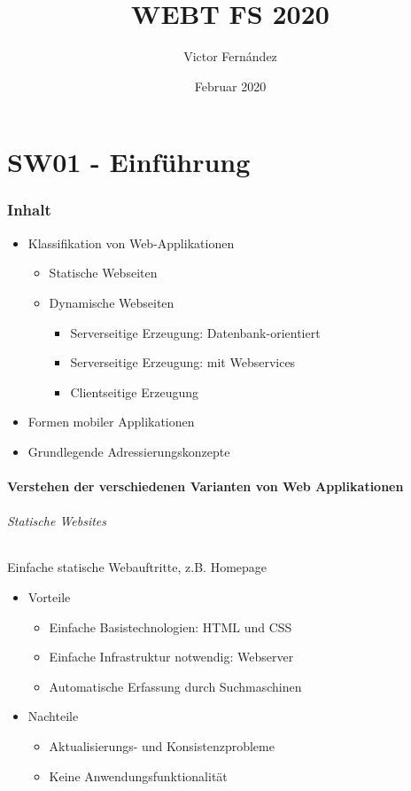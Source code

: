 \documentclass[10pt,a4paper]{article}
\title{WEBT FS 2020}
\author{Victor Fernández}
\date{Februar 2020}
\begin{document}
\maketitle
\tableofcontents
\thispagestyle{empty}
\pagebreak

\part{SW01 - Einführung}
\section{Inhalt}
\begin{itemize}[noitemsep,topsep=0pt,leftmargin=*]
    \item Klassifikation von Web-Applikationen
    \begin{itemize}[noitemsep,topsep=0pt,leftmargin=*]
        \item Statische Webseiten
        \item Dynamische Webseiten
        \begin{itemize}[noitemsep,topsep=0pt,leftmargin=*]
            \item Serverseitige Erzeugung: Datenbank-orientiert
            \item Serverseitige Erzeugung: mit Webservices
            \item Clientseitige Erzeugung
        \end{itemize}
    \end{itemize}
    \item Formen mobiler Applikationen
    \item Grundlegende Adressierungskonzepte
\end{itemize}

\subsection{Verstehen der verschiedenen Varianten von Web Applikationen}
\paragraph*{Statische Websites}Einfache statische Webauftritte, z.B. Homepage
\begin{itemize}[noitemsep,topsep=0pt,leftmargin=*]
    \item Vorteile
    \begin{itemize}[noitemsep,topsep=0pt,leftmargin=*]
        \item Einfache Basistechnologien: HTML und CSS
        \item Einfache Infrastruktur notwendig: Webserver
        \item Automatische Erfassung durch Suchmaschinen
    \end{itemize}
    \item Nachteile
    \begin{itemize}[noitemsep,topsep=0pt,leftmargin=*]
        \item Aktualisierungs- und Konsistenzprobleme
        \item Keine Anwendungsfunktionalität
    \end{itemize}
\end{itemize}
\end{document}
